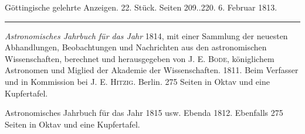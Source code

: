 \clearpage
{}
\hypertarget{native-553-lower}{}\label{native-553-lower}
\begin{center}\small Göttingische gelehrte Anzeigen. 22. Stück. Seiten 209..220. 6. Februar 1813.\\[3pt]\rule{.72\linewidth}{.3pt}\end{center}

\emph{Astronomisches Jahrbuch für das Jahr} 1814, mit einer Sammlung der neuesten Abhandlungen, Beobachtungen und Nachrichten aus den astronomischen Wissenschaften, berechnet und herausgegeben von J. E. \textsc{Bode}, königlichem Astronomen und Miglied der Akademie der Wissenschaften. 1811. Beim Verfasser und in Kommission bei J. E. \textsc{Hitzig}. Berlin. 275 Seiten in Oktav und eine Kupfertafel.

Astronomisches Jahrbuch für das Jahr 1815 usw. Ebenda 1812. Ebenfalls 275 Seiten in Oktav und eine Kupfertafel.

